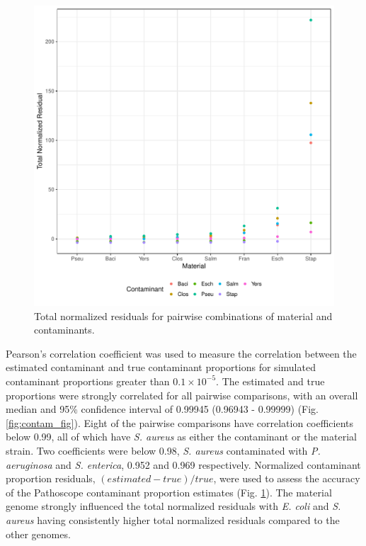 \documentclass[fleqn,10pt,lineno]{wlpeerj}\usepackage[]{graphicx}\usepackage[]{color}
\makeatletter
\def\maxwidth{ %
  \ifdim\Gin@nat@width>\linewidth
    \linewidth
  \else
    \Gin@nat@width
  \fi
}
\newenvironment{knitrout}{}{} %
\makeatother
\begin{document}
\begin{knitrout}
\color{fgcolor}\begin{figure}
\includegraphics[width=\maxwidth]{figure/contam_resid-1} \caption[Total normalized residuals for pairwise combinations of material and contaminants]{Total normalized residuals for pairwise combinations of material and contaminants.}\label{fig:contam_resid}
\end{figure}


\end{knitrout}


Pearson's correlation coefficient was used to measure the correlation between the estimated contaminant and true contaminant proportions for simulated contaminant proportions greater than $0.1\times 10^{-5}$. 
The estimated and true proportions were strongly correlated for all pairwise comparisons, with an overall median and 95\% confidence interval of 0.99945 (0.96943 - 0.99999) (Fig. \ref{fig:contam_fig}). 
Eight of the pairwise comparisons have correlation coefficients below 0.99, all of which have \textit{S. aureus} as either the contaminant or the material strain. 
Two coefficients were below 0.98, \textit{S. aureus} contaminated with \textit{P. aeruginosa} and \textit{S. enterica}, 0.952 and 0.969 respectively. 
Normalized contaminant proportion residuals, $(estimated-true)/true$, were used to assess the accuracy of the Pathoscope contaminant proportion estimates (Fig. \ref{fig:contam_resid}). 
The material genome strongly influenced the total normalized residuals with \textit{E. coli} and \textit{S. aureus} having consistently higher total normalized residuals compared to the other genomes. 
\end{document}
